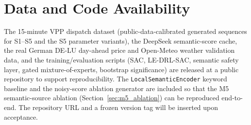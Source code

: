 \documentclass{ieeeaccess}
\begin{document}
\section*{Data and Code Availability}
The 15-minute VPP dispatch dataset (public-data-calibrated generated sequences for S1--S5 and the S5 parameter variants), the DeepSeek semantic-score cache, the real German DE-LU day-ahead price and Open-Meteo weather validation data, and the training/evaluation scripts (SAC, LE-DRL-SAC, semantic safety layer, gated mixture-of-experts, bootstrap significance) are released at a public repository to support reproducibility. The \texttt{LocalSemanticEncoder} keyword baseline and the noisy-score ablation generator are included so that the M5 semantic-source ablation (Section~\ref{sec:m5_ablation}) can be reproduced end-to-end. The repository URL and a frozen version tag will be inserted upon acceptance.
\end{document}
